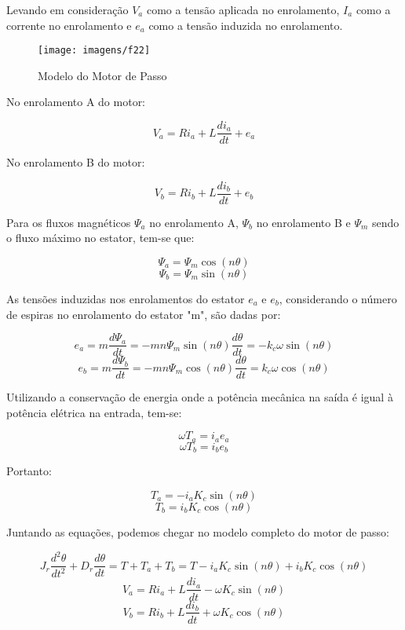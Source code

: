 Levando em consideração $V_a$ como a tensão aplicada no enrolamento, $I_a$ como a corrente no enrolamento e $e_a$ como a tensão induzida no enrolamento. 

\begin{figure}[ht!]
    \center 
    \texttt{[image: imagens/f22]}
    \caption{Modelo do Motor de Passo}
\end{figure}

No enrolamento A do motor:

$$V_a=Ri_a+L\frac{di_a}{dt}+e_a$$

No enrolamento B do motor: 

$$V_b=Ri_b+L\frac{di_b}{dt}+e_b$$

Para os fluxos magnéticos $\Psi_a$ no enrolamento A, $\Psi_b$ no enrolamento B e  $\Psi_m$ sendo o fluxo máximo no estator, tem-se que: 

$$\Psi_a=\Psi_m \cos (n\theta)$$
$$\Psi_b=\Psi_m \sin (n\theta) $$

As tensões induzidas nos enrolamentos do estator $e_a$ e $e_b$, considerando o número de espiras no enrolamento do estator "m", são dadas por: 

$$e_a=m\frac{d\Psi_a}{dt}=-mn\Psi_m\sin(n\theta)\frac{d\theta}{dt}= -k_c\omega \sin(n\theta)$$
$$e_b=m\frac{d\Psi_b}{dt}=-mn\Psi_m\cos(n\theta)\frac{d\theta}{dt}= k_c\omega \cos(n\theta)$$

Utilizando a conservação de energia onde a potência mecânica na saída é igual à potência elétrica na entrada, tem-se: 

$$\omega T_a=i_a e_a $$ 
$$\omega T_b=i_b e_b$$

Portanto: 

$$T_a=-i_aK_c\sin(n\theta)$$
$$T_b=i_bK_c\cos(n\theta)$$

Juntando as equações, podemos chegar no modelo completo do motor de passo: 

$$J_r\frac{d^2\theta}{dt^2}+D_r\frac{d\theta}{dt}= T+T_a+T_b=T-i_aK_c\sin(n\theta)+i_bK_c\cos(n\theta)$$
$$V_a=Ri_a+L\frac{di_a}{dt}-\omega K_c\sin(n\theta)$$
$$V_b=Ri_b+L\frac{di_b}{dt}+\omega K_c\cos(n\theta)$$

